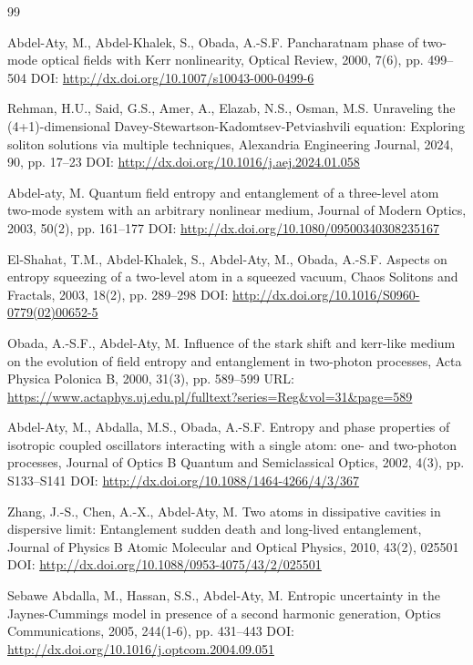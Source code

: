 \documentclass[10pt]{NSP1}
\begin{document}
\begin{thebibliography}{99}

 Abdel-Aty, M., Abdel-Khalek, S., Obada, A.-S.F.
Pancharatnam phase of two-mode optical fields with Kerr nonlinearity, Optical Review, 2000, 7(6), pp. 499--504 DOI: \url{http://dx.doi.org/10.1007/s10043-000-0499-6}

 Rehman, H.U., Said, G.S., Amer, A., Elazab, N.S., Osman, M.S.
Unraveling the (4+1)-dimensional Davey-Stewartson-Kadomtsev-Petviashvili equation: Exploring soliton solutions via multiple techniques, Alexandria Engineering Journal, 2024, 90, pp. 17--23 DOI: \url{http://dx.doi.org/10.1016/j.aej.2024.01.058}

 Abdel-aty, M.
Quantum field entropy and entanglement of a three-level atom two-mode system with an arbitrary nonlinear medium, Journal of Modern Optics, 2003, 50(2), pp. 161--177 DOI: \url{http://dx.doi.org/10.1080/09500340308235167}

 El-Shahat, T.M., Abdel-Khalek, S., Abdel-Aty, M., Obada, A.-S.F.
Aspects on entropy squeezing of a two-level atom in a squeezed vacuum, Chaos Solitons and Fractals, 2003, 18(2), pp. 289--298 DOI: \url{http://dx.doi.org/10.1016/S0960-0779(02)00652-5}

 Obada, A.-S.F., Abdel-Aty, M.
Influence of the stark shift and kerr-like medium on the evolution of field entropy and entanglement in two-photon processes, Acta Physica Polonica B, 2000, 31(3), pp. 589--599 URL: \url{https://www.actaphys.uj.edu.pl/fulltext?series=Reg&vol=31&page=589}

 Abdel-Aty, M., Abdalla, M.S., Obada, A.-S.F.
Entropy and phase properties of isotropic coupled oscillators interacting with a single atom: one- and two-photon processes, Journal of Optics B Quantum and Semiclassical Optics, 2002, 4(3), pp. S133--S141 DOI: \url{http://dx.doi.org/10.1088/1464-4266/4/3/367}

 Zhang, J.-S., Chen, A.-X., Abdel-Aty, M.
Two atoms in dissipative cavities in dispersive limit: Entanglement sudden death and long-lived entanglement, Journal of Physics B Atomic Molecular and Optical Physics, 2010, 43(2), 025501 DOI: \url{http://dx.doi.org/10.1088/0953-4075/43/2/025501}

 Sebawe Abdalla, M., Hassan, S.S., Abdel-Aty, M.
Entropic uncertainty in the Jaynes-Cummings model in presence of a second harmonic generation, Optics Communications, 2005, 244(1-6), pp. 431--443 DOI: \url{http://dx.doi.org/10.1016/j.optcom.2004.09.051}


\end{thebibliography}
\end{document}
